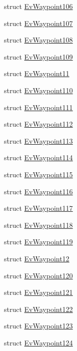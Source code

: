 \begin{DoxyCompactItemize}
struct \hyperlink{structmove__base__z__client_1_1EvWaypoint106}{Ev\+Waypoint106}
\item 
struct \hyperlink{structmove__base__z__client_1_1EvWaypoint107}{Ev\+Waypoint107}
\item 
struct \hyperlink{structmove__base__z__client_1_1EvWaypoint108}{Ev\+Waypoint108}
\item 
struct \hyperlink{structmove__base__z__client_1_1EvWaypoint109}{Ev\+Waypoint109}
\item 
struct \hyperlink{structmove__base__z__client_1_1EvWaypoint11}{Ev\+Waypoint11}
\item 
struct \hyperlink{structmove__base__z__client_1_1EvWaypoint110}{Ev\+Waypoint110}
\item 
struct \hyperlink{structmove__base__z__client_1_1EvWaypoint111}{Ev\+Waypoint111}
\item 
struct \hyperlink{structmove__base__z__client_1_1EvWaypoint112}{Ev\+Waypoint112}
\item 
struct \hyperlink{structmove__base__z__client_1_1EvWaypoint113}{Ev\+Waypoint113}
\item 
struct \hyperlink{structmove__base__z__client_1_1EvWaypoint114}{Ev\+Waypoint114}
\item 
struct \hyperlink{structmove__base__z__client_1_1EvWaypoint115}{Ev\+Waypoint115}
\item 
struct \hyperlink{structmove__base__z__client_1_1EvWaypoint116}{Ev\+Waypoint116}
\item 
struct \hyperlink{structmove__base__z__client_1_1EvWaypoint117}{Ev\+Waypoint117}
\item 
struct \hyperlink{structmove__base__z__client_1_1EvWaypoint118}{Ev\+Waypoint118}
\item 
struct \hyperlink{structmove__base__z__client_1_1EvWaypoint119}{Ev\+Waypoint119}
\item 
struct \hyperlink{structmove__base__z__client_1_1EvWaypoint12}{Ev\+Waypoint12}
\item 
struct \hyperlink{structmove__base__z__client_1_1EvWaypoint120}{Ev\+Waypoint120}
\item 
struct \hyperlink{structmove__base__z__client_1_1EvWaypoint121}{Ev\+Waypoint121}
\item 
struct \hyperlink{structmove__base__z__client_1_1EvWaypoint122}{Ev\+Waypoint122}
\item 
struct \hyperlink{structmove__base__z__client_1_1EvWaypoint123}{Ev\+Waypoint123}
\item 
struct \hyperlink{structmove__base__z__client_1_1EvWaypoint124}{Ev\+Waypoint124}

\end{DoxyCompactItemize}
